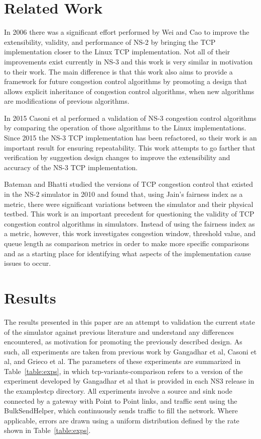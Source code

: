 \documentclass[conference]{IEEEtran}
\begin{document}
\section{Related Work}

In 2006 there was a significant effort performed by Wei and Cao \cite{NS2Linux} to improve the extensibility, validity, and performance of NS-2 by bringing the TCP implementation closer to the Linux TCP implementation. Not all of their improvements exist currently in NS-3 and this work is very similar in motivation to their work. The main difference is that this work also aims to provide a framework for future congestion control algorithms by promoting a design that allows explicit inheritance of congestion control algorithms, when new algorithms are modifications of previous algorithms. 

In 2015 Casoni et al \cite{NS3Val} performed a validation of NS-3 congestion control algorithms by comparing the operation of those algorithms to the Linux implementations. Since 2015 the NS-3 TCP implementation has been refactored, so their work is an important result for ensuring repeatability. This work attempts to go farther that verification by suggestion design changes to improve the extensibility and accuracy of the NS-3 TCP implementation. 

Bateman and Bhatti \cite{NS2TCPQ} studied the versions of TCP congestion control that existed in the NS-2 simulator in 2010 and found that, using Jain's fairness index as a metric, there were significant variations between the simulator and their physical testbed. This work is an important precedent for questioning the validity of TCP congestion control algorithms in simulators. Instead of using the fairness index as a metric, however, this work investigates congestion window, threshold value, and queue length as comparison metrics in order to make more specific comparisons and as a starting place for identifying what aspects of the implementation cause issues to occur. 

\section{Results} 

The results presented in this paper are an attempt to validation the current state of the simulator against previous literature and understand any differences encountered, as motivation for promoting the previously described design. As such, all experiments are taken from previous work by Gangadhar et al\cite{NS3W}, Casoni et al\cite{NS3Val}, and Grieco et al\cite{NS2WP}. The parameters of these experiments are summarized in Table~\ref{table:exps}, in which tcp-variants-comparison refers to a version of the experiment developed by Gangadhar et al\cite{NS3W} that is provided in each NS3 release in the examples\/tcp directory. All experiments involve a source and sink node connected by a gateway with Point to Point links, and traffic sent using the BulkSendHelper, which continuously sends traffic to fill the network. Where applicable, errors are drawn using a uniform distribution defined by the rate shown in Table~\ref{table:exps}. 
\end{document}
